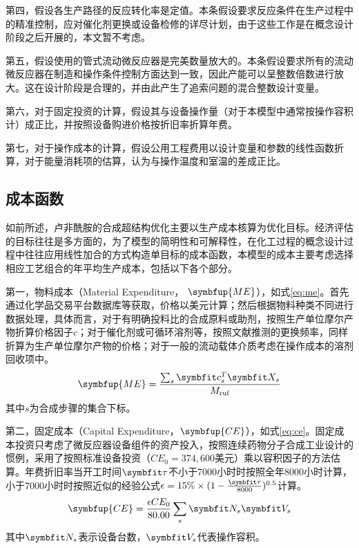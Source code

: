 第四，假设各生产路径的反应转化率是定值。本条假设要求反应条件在生产过程中的精准控制，应对催化剂更换或设备检修的详尽计划，由于这些工作是在概念设计阶段之后开展的，本文暂不考虑。

第五，假设使用的管式流动微反应器是完美数量放大的。本条假设要求所有的流动微反应器在制造和操作条件控制方面达到一致，因此产能可以呈整数倍数进行放大。这在设计阶段是合理的，并由此产生了追索问题的混合整数设计变量。

第六，对于固定投资的计算，假设其与设备操作量（对于本模型中通常按操作容积计）成正比，并按照设备购进价格按折旧率折算年费。

第七，对于操作成本的计算，假设公用工程费用以设计变量和参数的线性函数折算，对于能量消耗项的估算，认为与操作温度和室温的差成正比。

\subsection{成本函数}

如前所述，卢非酰胺的合成超结构优化主要以生产成本核算为优化目标。经济评估的目标往往是多方面的，为了模型的简明性和可解释性，在化工过程的概念设计过程中往往应用线性加合的方式构造单目标的成本函数\cite{yeoman1999,gong2017,madenoor2018}，本模型的成本主要考虑选择相应工艺组合的年平均生产成本，包括以下各个部分。

第一，物料成本（Material Expenditure， $\symbfup{ME}$），如式\eqref{eq:me}。首先通过化学品交易平台数据库等获取，价格以美元计算；然后根据物料种类不同进行数据处理，具体而言，对于有明确投料比的合成原料或助剂，按照生产单位摩尔产物折算价格因子$c$；对于催化剂或可循环溶剂等，按照文献推测的更换频率，同样折算为生产单位摩尔产物的价格；对于一般的流动载体介质考虑在操作成本的溶剂回收项中。
\begin{align}
  \symbfup{ME} = \frac{\sum_{s}\symbfit c_s^T\symbfit X_s}{M_{\rm ruf}} \label{eq:me}
\end{align}
其中$s$为合成步骤的集合下标。

第二，固定成本（Capital Expenditure，$\symbfup{CE}$），如式\eqref{eq:ce}。固定成本投资只考虑了微反应器设备组件的资产投入\cite{diab2018,borukhova2016}，按照连续药物分子合成工业设计的惯例，采用了按照标准设备投资（$CE_0=374,600$美元）乘以容积因子\cite{diab2019}的方法估算。年费折旧率当开工时间$\symbfit\tau$不小于7000小时时按照全年8000小时计算，小于7000小时时按照近似的经验公式$\epsilon=15\%\times(1-\frac{\symbfit\tau}{8000})^{0.5}$计算\cite{baasal1989}。
\begin{align}
  \symbfup{CE} = \frac{\epsilon CE_0}{80.00}\sum_{s}\symbfit N_s\symbfit V_s \label{eq:ce}
\end{align}
其中$\symbfit N_s$表示设备台数，$\symbfit V_s$代表操作容积。

